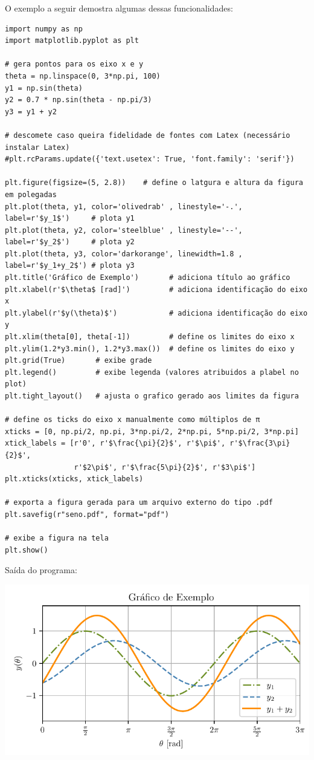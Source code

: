 O exemplo a seguir demostra algumas dessas funcionalidades:
\begin{verbatim}
import numpy as np
import matplotlib.pyplot as plt

# gera pontos para os eixo x e y
theta = np.linspace(0, 3*np.pi, 100)
y1 = np.sin(theta)
y2 = 0.7 * np.sin(theta - np.pi/3)
y3 = y1 + y2

# descomete caso queira fidelidade de fontes com Latex (necessário instalar Latex)
#plt.rcParams.update({'text.usetex': True, 'font.family': 'serif'})

plt.figure(figsize=(5, 2.8))    # define o latgura e altura da figura em polegadas
plt.plot(theta, y1, color='olivedrab' , linestyle='-.', label=r'$y_1$')     # plota y1
plt.plot(theta, y2, color='steelblue' , linestyle='--', label=r'$y_2$')     # plota y2
plt.plot(theta, y3, color='darkorange', linewidth=1.8 , label=r'$y_1+y_2$') # plota y3
plt.title('Gráfico de Exemplo')       # adiciona título ao gráfico
plt.xlabel(r'$\theta$ [rad]')         # adiciona identificação do eixo x
plt.ylabel(r'$y(\theta)$')            # adiciona identificação do eixo y
plt.xlim(theta[0], theta[-1])         # define os limites do eixo x
plt.ylim(1.2*y3.min(), 1.2*y3.max())  # define os limites do eixo y
plt.grid(True)       # exibe grade
plt.legend()         # exibe legenda (valores atribuidos a plabel no plot)
plt.tight_layout()   # ajusta o grafico gerado aos limites da figura

# define os ticks do eixo x manualmente como múltiplos de π
xticks = [0, np.pi/2, np.pi, 3*np.pi/2, 2*np.pi, 5*np.pi/2, 3*np.pi]
xtick_labels = [r'0', r'$\frac{\pi}{2}$', r'$\pi$', r'$\frac{3\pi}{2}$',
                r'$2\pi$', r'$\frac{5\pi}{2}$', r'$3\pi$']
plt.xticks(xticks, xtick_labels)

# exporta a figura gerada para um arquivo externo do tipo .pdf
plt.savefig(r"seno.pdf", format="pdf")

# exibe a figura na tela
plt.show()
\end{verbatim}

Saída do programa:
\begin{center}
    \includegraphics[scale=1.0]{figs/seno}
\end{center}

